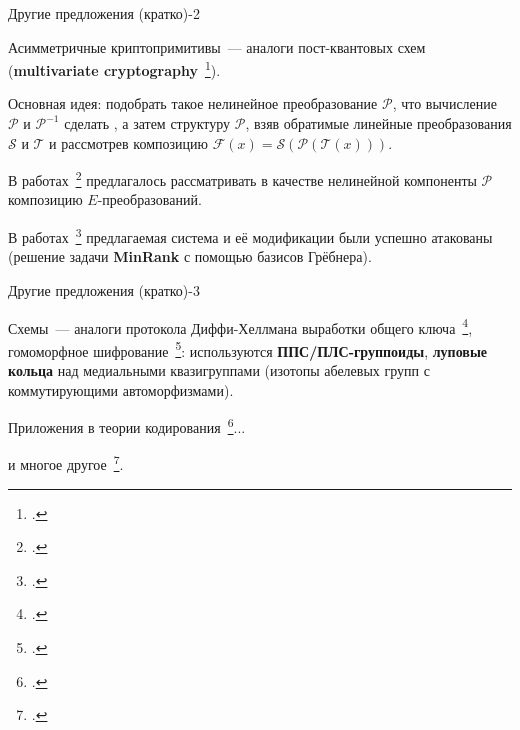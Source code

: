 \begin{frame}{Другие предложения (кратко)-2}
    \begin{coloritemize}
        \item Асимметричные криптопримитивы~--- аналоги пост-квантовых схем (\textbf{multivariate cryptography}~\footcite{preneel}).
        \pause
        \item Основная идея: подобрать такое нелинейное преобразование $\mathcal{P}$, что вычисление $\mathcal{P}$ и $\mathcal{P}^{-1}$ сделать  , а затем   структуру $\mathcal{P}$, взяв обратимые линейные преобразования $\mathcal{S}$ и $\mathcal{T}$ и рассмотрев композицию 
        \(
            \mathcal{F}(x) = \mathcal{S} \left( \mathcal{P} \left(\mathcal{T}(x) \right) \right).
        \)
        \pause 
        \item В работах~\footcite{gligoroski2008public, gligoroski2008multivariate, chen2010multivariate, gligoroski2011mqq} предлагалось рассматривать в качестве нелинейной компоненты $\mathcal{P}$ композицию $E$-преобразований.
        \pause 
        \item В работах~\footcite{mohamed2009algebraic, faugere2015polynomial} предлагаемая система и её модификации были успешно атакованы (решение задачи \textbf{MinRank} с помощью базисов Грёбнера).
    \end{coloritemize}
\end{frame}


\begin{frame}{Другие предложения (кратко)-3}
    \begin{coloritemize}
        \item Схемы~--- аналоги протокола Диффи-Хеллмана выработки общего ключа~\footcite{katyshev14, katyshev18}, гомоморфное шифрование~\footcite{gribov2010construction, gribov15, markov20}: используются \textbf{ППС/ПЛС-группоиды}, \textbf{луповые кольца} над медиальными квазигруппами (изотопы абелевых групп с коммутирующими автоморфизмами).
        \pause
        \item Приложения в теории кодирования~\footcite{nechaev98, nechaev04, couselo2004loop, markov12, markov2020nonassociative}...
        \pause 
        \item и многое другое~\footcite{glukhov, artamonov18, shcherbacov2017elements, chauhan2021quasigroups}.
    \end{coloritemize}
\end{frame}


